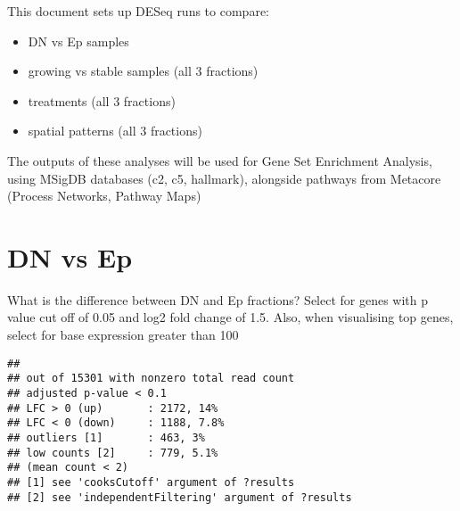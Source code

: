 \documentclass[
]{book}
\providecommand{\tightlist}{%
  \setlength{\itemsep}{0pt}\setlength{\parskip}{0pt}}
\begin{document}
This document sets up DESeq runs to compare:

\begin{itemize}
\tightlist
\item
  DN vs Ep samples
\item
  growing vs stable samples (all 3 fractions)
\item
  treatments (all 3 fractions)
\item
  spatial patterns (all 3 fractions)
\end{itemize}

The outputs of these analyses will be used for Gene Set Enrichment Analysis,
using MSigDB databases (c2, c5, hallmark), alongside pathways from Metacore (Process Networks, Pathway Maps)

\hypertarget{dn-vs-ep}{%
\section{DN vs Ep}\label{dn-vs-ep}}

What is the difference between DN and Ep fractions?
Select for genes with p value cut off of 0.05 and log2 fold change of 1.5.
Also, when visualising top genes, select for base expression greater than 100

\begin{verbatim}
## 
## out of 15301 with nonzero total read count
## adjusted p-value < 0.1
## LFC > 0 (up)       : 2172, 14%
## LFC < 0 (down)     : 1188, 7.8%
## outliers [1]       : 463, 3%
## low counts [2]     : 779, 5.1%
## (mean count < 2)
## [1] see 'cooksCutoff' argument of ?results
## [2] see 'independentFiltering' argument of ?results
\end{verbatim}
\end{document}
